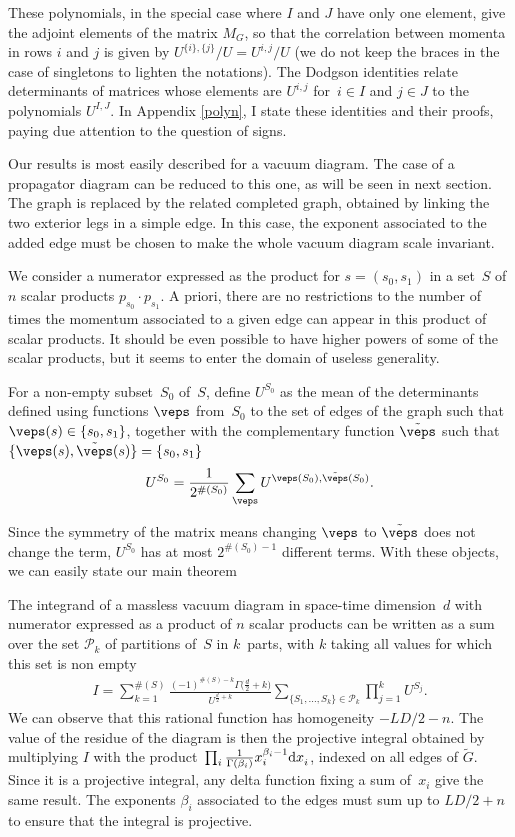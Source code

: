 These polynomials, in the special case where $I$ and $J$ have only one element,
give the adjoint elements of the matrix $M_G$, so that the correlation between momenta in rows
$i$ and $j$ is given by $U^{\{i\},\{j\}}/U=U^{i,j}/U$ (we do not keep the braces in the case of
singletons to lighten the notations). The Dodgson identities relate determinants of matrices whose elements
are $U^{i,j}$ for~${i \in I}$ and $j \in J$ to the polynomials $U^{I ,J}$. In Appendix \ref{polyn}, I state these
identities and their proofs, paying due attention to the question of signs.

Our results is most easily described for a vacuum diagram. The case of a propagator diagram can be reduced to this one, as will be seen in next
section.
The graph is replaced by the related completed graph,
obtained by linking the two exterior legs in a simple edge. In this case, the exponent associated to the added edge
must be chosen to make the whole vacuum diagram scale invariant.

We consider a numerator expressed as the product for $s=(s_0,s_1)$ in a set~$S$ of $n$ scalar
products $p_{s_0} \cdot p_{s_1}$. A priori, there are no restrictions to the number of times the momentum
associated to a given edge can appear in this product of scalar products. It should be even possible to have higher
powers of some of the scalar products, but it seems to enter the domain of useless generality.
\begin{Definition}
For a non-empty subset~$S_0$ of~$S$, define $U^{S_0}$ as the mean of the determinants defined using
functions $\veps$ from~$S_0$ to the set of edges of the graph such that
$\veps(s) \in \{s_0,s_1\}$, together with the complementary function
$\tilde\veps$ such that $\{\veps(s),\tilde\veps(s)\} =
\{s_0,s_1\}$
\[
	U^{S_0} = \frac1 {2^{\#(S_0)}} \sum_{\veps} U^{\veps(S_0), \tilde\veps(S_0)}.
\]
\end{Definition}
Since the symmetry of the matrix means changing $\veps$
to $\tilde\veps$ does not change the term, $U^{S_0}$ has at most
$2^{\#(S_0)-1}$ different terms. With these objects, we can easily state our main theorem
\begin{Theorem}\label{fund}
The integrand of a massless vacuum diagram in space-time dimension~$d$ with numerator expressed
as a product of $n$ scalar products can be written as a sum over the set
$\mathcal P_k$ of partitions of~$S$ in $k$~parts, with $k$ taking all values for which this set is
non empty
\begin{gather*}
	I = \sum_{k=1}^{\#(S)} \frac{(-1)^{\#(S)-k}\Gamma\bigl(\frac d2 + k\bigr)}{U^{\frac d2 +k} }
			\sum_{\{S_1,\ldots,S_k\} \in \mathcal P_k} \prod_{j=1}^k U^{S_j}.
\end{gather*}
We can observe that this rational function has homogeneity $-L D/2 - n$.
The value of the residue of the diagram is then the projective integral obtained by multiplying $I$ with the
product~${\prod_i \frac 1{\Gamma(\beta_i)} x_i^{\beta_i-1} {\rm d }x_i^{\vphantom{\beta_i}}}$,
indexed on all edges of $\tilde G$. Since it is a projective integral, any delta function fixing a sum
of~$x_i$ give the same result. The exponents $\beta_i$ associated to the edges must sum up to $L D/2 + n$ to ensure that the integral is
projective.
\end{Theorem}
